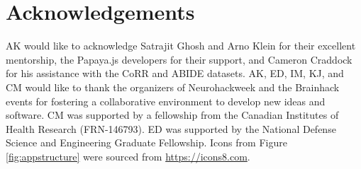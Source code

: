 \section{Acknowledgements}
AK would like to acknowledge Satrajit Ghosh and Arno Klein for their excellent mentorship, the Papaya.js developers for their support, and Cameron Craddock for his assistance with the CoRR and ABIDE datasets. AK, ED, IM, KJ, and CM would like to thank the organizers of Neurohackweek and the Brainhack events for fostering a collaborative environment to develop new ideas and software. CM was supported by a fellowship from the Canadian Institutes of Health Research (FRN-146793).  ED was supported by the National Defense Science and Engineering Graduate Fellowship. Icons from Figure \ref{fig:appstructure} were sourced from \href{https://icons8.com}{https://icons8.com}.

